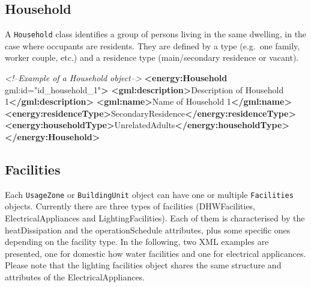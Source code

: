 \documentclass[a4paper,12pt]{article}
\newenvironment{Shaded}{}{}
\newcommand{\KeywordTok}[1]{\textcolor[rgb]{0.00,0.44,0.13}{\textbf{{#1}}}}
\newcommand{\StringTok}[1]{\textcolor[rgb]{0.25,0.44,0.63}{{#1}}}
\newcommand{\CommentTok}[1]{\textcolor[rgb]{0.38,0.63,0.69}{\textit{{#1}}}}
\newcommand{\OtherTok}[1]{\textcolor[rgb]{0.00,0.44,0.13}{{#1}}}
\newcommand{\NormalTok}[1]{{#1}}
\begin{document}
\subsection{Household}\label{household}

A \texttt{Household} class identifies a group of persons living in the
same dwelling, in the case where occupants are residents. They are
defined by a type (e.g.~one family, worker couple, etc.) and a residence
type (main/secondary residence or vacant).

\begin{Shaded}
\begin{Highlighting}[]
\CommentTok{<!--Example of a Household object-->}
\KeywordTok{<energy:Household}\OtherTok{ gml:id=}\StringTok{"id_household_1"}\KeywordTok{>}
    \KeywordTok{<gml:description>}\NormalTok{Description of Household 1}\KeywordTok{</gml:description>}
    \KeywordTok{<gml:name>}\NormalTok{Name of Household 1}\KeywordTok{</gml:name>}
    \KeywordTok{<energy:residenceType>}\NormalTok{SecondaryResidence}\KeywordTok{</energy:residenceType>}
    \KeywordTok{<energy:householdType>}\NormalTok{UnrelatedAdults}\KeywordTok{</energy:householdType>}
\KeywordTok{</energy:Household>}
\end{Highlighting}
\end{Shaded}

\subsection{Facilities}\label{facilities}

Each \texttt{UsageZone} or \texttt{BuildingUnit} object can have one or
multiple \texttt{Facilities} objects. Currently there are three types of
facilities (DHWFacilities, ElectricalAppliances and LightingFacilities).
Each of them is characterised by the heatDissipation and the
operationSchedule attributes, plus some specific ones depending on the
facility type. In the following, two XML examples are presented, one for
domestic how water facilities and one for electrical applicances. Please
note that the lighting facilities object shares the same structure and
attributes of the ElectricalAppliances.
\end{document}
